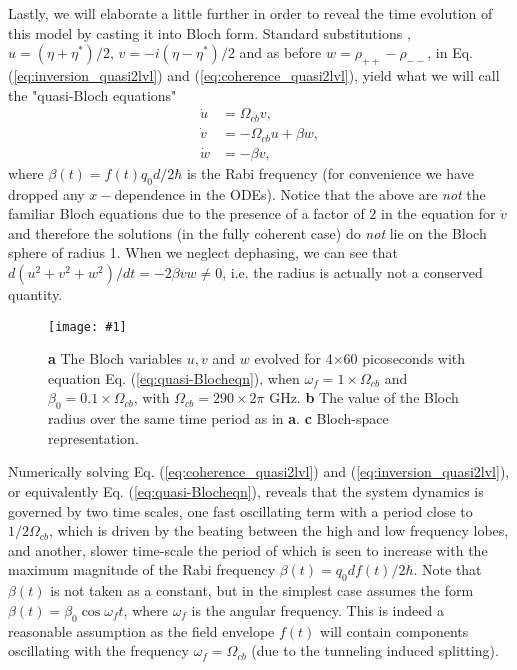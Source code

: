 \documentclass[]{spie}  %
\newcommand{\includegraphicsXL}[1]{\texttt{[image: \#1]}}
\begin{document}
Lastly, we will elaborate a little further in order to reveal the time evolution of this model by casting it into Bloch form. Standard substitutions \cite{boyd2003nonlinear}, $u=(\eta + \eta^*)/2$, $v = -i(\eta - \eta^*)/2$ and as before $w = \rho_{++}-\rho_{--}$, in Eq. (\ref{eq:inversion_quasi2lvl}) and (\ref{eq:coherence_quasi2lvl}), yield what we will call the "quasi-Bloch equations"
\begin{subequations}
	\label{eq:quasi-Blocheqn}
	\begin{align}
	\dot{u} &= \Omega_{cb} v , \\
	\dot{v} &= -\Omega_{cb} u +\beta w , \\
	\dot{w} &= -\beta v,
	\end{align}
\end{subequations}
where $\beta(t) = f(t)q_0d/2\hbar$ is the Rabi frequency (for convenience we have dropped any $x-$dependence in the ODEs). Notice that the above are \emph{not} the familiar Bloch equations due to the presence of a factor of $2$ in the equation for $\dot{v}$ and therefore the solutions (in the fully coherent case) do \emph{not} lie on the Bloch sphere of radius 1. When we neglect dephasing, we can see that $d(u^2+v^2+w^2)/dt = -2\beta vw \neq 0$, i.e. the radius is actually not a conserved quantity.
\begin{figure}[h!]
	\begin{center}
		\includegraphicsXL{IMGS/quasi-bloch_resonance.eps}
		\caption{\textbf{a} The Bloch variables $u,v$ and $w$ evolved for 4$\times$60 picoseconds with equation Eq. (\ref{eq:quasi-Blocheqn}), when $\omega_f = 1\times\Omega_{cb}$ and $\beta_0 = 0.1\times\Omega_{cb}$, with $\Omega_{cb} = 290\times 2\pi$ GHz. \textbf{b} The value of the Bloch radius over the same time period as in \textbf{a}. \textbf{c} Bloch-space representation.} \label{fig:quasi-bloch-resonance}
	\end{center}	
\end{figure}
Numerically solving Eq. (\ref{eq:coherence_quasi2lvl}) and (\ref{eq:inversion_quasi2lvl}), or equivalently Eq. (\ref{eq:quasi-Blocheqn}), reveals that the system dynamics is governed by two time scales, one fast oscillating term with a period close to $1/2\Omega_{cb}$, which is driven by the beating between the high and low frequency lobes, and another, slower time-scale the period of which is seen to increase with the maximum magnitude of the Rabi frequency $\beta(t) = q_0df(t)/2\hbar$. Note that $\beta(t)$ is not taken as a constant, but in the simplest case assumes the form $\beta(t) = \beta_0 \cos\omega_f t$, where $\omega_f$ is  the angular frequency. This is indeed a reasonable assumption as the field envelope $f(t)$ will contain components oscillating with the frequency $\omega_f = \Omega_{cb}$ (due to the tunneling induced splitting). 
\end{document}
